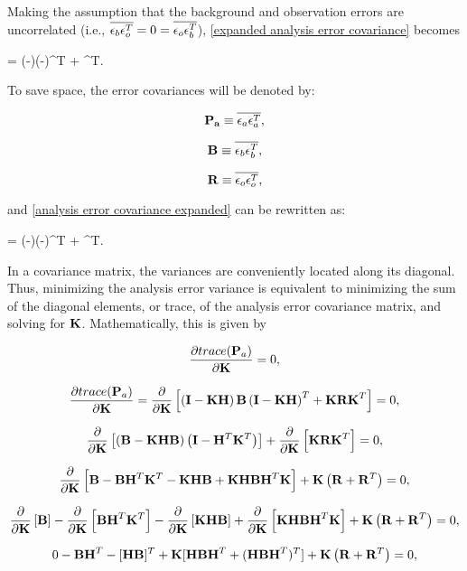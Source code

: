 \noindent Making the assumption that the background and observation errors are uncorrelated (i.e., $\overline{\epsilon_b\epsilon_o^T} = 0 = \overline{\epsilon_o\epsilon_b^T}$), \ref{expanded analysis error covariance} becomes


\be
    \label{analysis error covariance expanded}
     =
    \left(-\right)\left(-\right)^T + ^T.
\ee


\noindent To save space, the error covariances will be denoted by:


$$
    \mathbf{P_a} \equiv \overline{\epsilon_a\epsilon_a^T},
$$


$$
    \mathbf{B} \equiv \overline{\epsilon_b\epsilon_b^T},
$$


$$
    \mathbf{R} \equiv \overline{\epsilon_o\epsilon_o^T},
$$


\noindent and \ref{analysis error covariance expanded} can be rewritten as:


\be
    \label{analysis error covariance}
     =
    \left(-\right)\left(-\right)^T +
    ^T.
\ee


In a covariance matrix, the variances are conveniently located along its diagonal. Thus, minimizing the analysis error variance is equivalent to minimizing the sum of the diagonal elements, or trace, of the analysis error covariance matrix, and solving for $\mathbf{K}$. Mathematically, this is given by


$$
    \frac{\partial trace(\mathbf{P}_a)}{\partial\mathbf{K}} = 0,
$$


$$
    \frac{\partial trace(\mathbf{P}_a)}{\partial\mathbf{K}} = \frac{\partial}{\partial\mathbf{K}}\left[\left(\mathbf{I}-\mathbf{KH}\right)\mathbf{B}\left(\mathbf{I}-\mathbf{KH}\right)^T + \mathbf{KRK}^T\right]= 0,
$$


$$
    \frac{\partial}{\partial\mathbf{K}}\left[\left(\mathbf{B}-\mathbf{KHB}\right)\left(\mathbf{I}-\mathbf{H}^T\mathbf{K}^T\right)\right] + \frac{\partial}{\partial\mathbf{K}}\left[\mathbf{KRK}^T\right]= 0,
$$


$$
    \frac{\partial}{\partial\mathbf{K}}\left[\mathbf{B} - \mathbf{BH}^T\mathbf{K}^T - \mathbf{KHB} + \mathbf{KHBH}^T\mathbf{K}\right] + \mathbf{K}\left(\mathbf{R} + \mathbf{R}^T\right)= 0,
$$


$$
    \frac{\partial}{\partial\mathbf{K}}\left[\mathbf{B}\right] - \frac{\partial}{\partial\mathbf{K}}\left[\mathbf{BH}^T\mathbf{K}^T\right] - \frac{\partial}{\partial\mathbf{K}}\left[\mathbf{KHB}\right] + \frac{\partial}{\partial\mathbf{K}}\left[\mathbf{KHBH}^T\mathbf{K}\right] + \mathbf{K}\left(\mathbf{R} + \mathbf{R}^T\right)= 0,
$$


$$
    0 - \mathbf{BH}^T - [\mathbf{HB}]^T + \mathbf{K}[\mathbf{HBH}^T + (\mathbf{HBH}^T)^T] + \mathbf{K}\left(\mathbf{R} + \mathbf{R}^T\right)= 0,
$$


